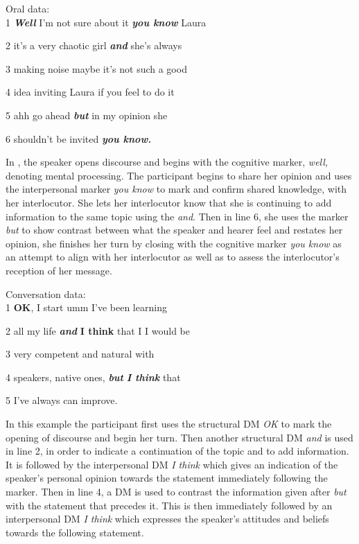 \documentclass[output=paper]{langsci/langscibook}
\begin{document}
\ea\label{ex:ament:1}
 {Oral  data:} \\
 
1   \textbf{\textit{Well}} I'm not sure about it \textbf{\textit{you know}} Laura 
 
2   it’s a very chaotic girl \textbf{\textit{and}} she’s always 
 
3   making noise maybe it’s not such a good 
 
4   idea inviting Laura if you feel to do it 
 
5   ahh go ahead \textbf{\textit{but}} in my opinion she 
 
6   shouldn’t be invited \textbf{\textit{you know.}} 
\z

In , the speaker opens discourse and begins with the cognitive marker, \textit{well,} denoting mental processing. The participant begins to share her opinion and uses the interpersonal marker \textit{you know} to mark and confirm shared knowledge, with her interlocutor. She lets her interlocutor know that she is continuing to add information to the same topic using the  \textit{and}. Then in line 6, she uses the  marker \textit{but} to show contrast between what the speaker and hearer feel and restates her opinion, she finishes her turn by closing with the cognitive marker \textit{you know} as an attempt to align with her interlocutor as well as to assess the interlocutor’s reception of her message. 

\ea\label{ex:ament:2} 
 {Conversation data:} \\
 
1 \textbf{OK}, I start umm I’ve been learning   

2 all my life \textbf{\textit{and}}\textbf{ \textbf{I think}} that I I would be 

3 very competent and natural with  

4   speakers, native ones, \textbf{\textit{but}} \textbf{\textit{I think}} that 

5 I’ve always can improve. 
\z

In this example the participant first uses the structural DM \textit{OK} to mark the opening of discourse and begin her turn. Then another structural DM \textit{and} is used in line 2, in order to indicate a continuation of the topic and to add information. It is followed by the interpersonal DM \textit{I think} which gives an indication of the speaker’s personal opinion towards the statement immediately following the marker. Then in line 4, a  DM is used to contrast the information given after \textit{but} with the statement that precedes it. This is then immediately followed by an interpersonal DM \textit{I think} which expresses the speaker’s attitudes and beliefs towards the following statement.
\end{document}
